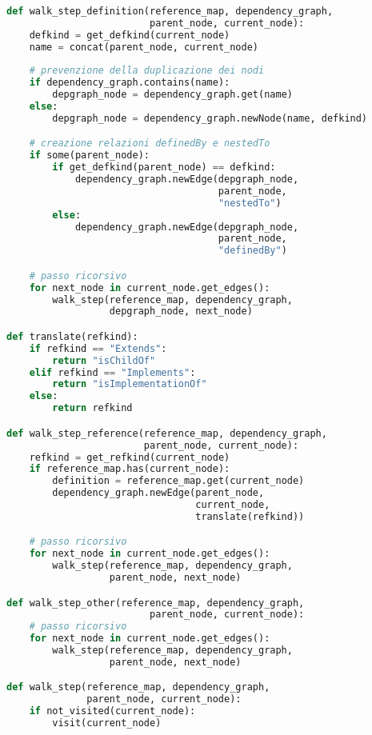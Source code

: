 \begin{lstlisting}[language=Python, caption=pseudocodice]
def walk_step_definition(reference_map, dependency_graph,
                         parent_node, current_node):
    defkind = get_defkind(current_node)
    name = concat(parent_node, current_node)
    
    # prevenzione della duplicazione dei nodi
    if dependency_graph.contains(name):
        depgraph_node = dependency_graph.get(name)
    else:
        depgraph_node = dependency_graph.newNode(name, defkind)

    # creazione relazioni definedBy e nestedTo
    if some(parent_node):
        if get_defkind(parent_node) == defkind:
            dependency_graph.newEdge(depgraph_node,
                                     parent_node,
                                     "nestedTo")
        else:
            dependency_graph.newEdge(depgraph_node,
                                     parent_node,
                                     "definedBy")

    # passo ricorsivo
    for next_node in current_node.get_edges():
        walk_step(reference_map, dependency_graph,
                  depgraph_node, next_node)

def translate(refkind):
    if refkind == "Extends":
        return "isChildOf"
    elif refkind == "Implements":
        return "isImplementationOf"
    else:
        return refkind

def walk_step_reference(reference_map, dependency_graph,
                        parent_node, current_node):
    refkind = get_refkind(current_node)
    if reference_map.has(current_node):
        definition = reference_map.get(current_node)
        dependency_graph.newEdge(parent_node,
                                 current_node,
                                 translate(refkind))

    # passo ricorsivo
    for next_node in current_node.get_edges():
        walk_step(reference_map, dependency_graph,
                  parent_node, next_node)

def walk_step_other(reference_map, dependency_graph,
                         parent_node, current_node):
    # passo ricorsivo
    for next_node in current_node.get_edges():
        walk_step(reference_map, dependency_graph,
                  parent_node, next_node)

def walk_step(reference_map, dependency_graph,
              parent_node, current_node):
    if not_visited(current_node):
        visit(current_node)


\end{lstlisting}
